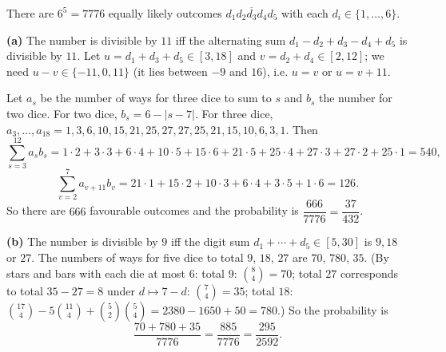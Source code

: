 There are \(6^5=7776\) equally likely outcomes \(\overline{d_1d_2d_3d_4d_5}\) with each \(d_i\in\{1,\dots,6\}\).

\textbf{(a)} The number is divisible by \(11\) iff the alternating sum \(d_1-d_2+d_3-d_4+d_5\) is divisible by \(11\). Let \(u=d_1+d_3+d_5\in[3,18]\) and \(v=d_2+d_4\in[2,12]\); we need \(u-v\in\{-11,0,11\}\) (it lies between \(-9\) and \(16\)), i.e. \(u=v\) or \(u=v+11\).

Let \(a_s\) be the number of ways for three dice to sum to \(s\) and \(b_s\) the number for two dice. For two dice, \(b_s=6-|s-7|\). For three dice, \(a_3,\dots,a_{18}=1,3,6,10,15,21,25,27,27,25,21,15,10,6,3,1\). Then
\[
\sum_{s=3}^{12}a_sb_s=1\cdot2+3\cdot3+6\cdot4+10\cdot5+15\cdot6+21\cdot5+25\cdot4+27\cdot3+27\cdot2+25\cdot1=540,
\]
\[
\sum_{v=2}^{7}a_{v+11}b_v=21\cdot1+15\cdot2+10\cdot3+6\cdot4+3\cdot5+1\cdot6=126 .
\]
So there are \(666\) favourable outcomes and the probability is \(\dfrac{666}{7776}=\boxed{\dfrac{37}{432}}\).

\textbf{(b)} The number is divisible by \(9\) iff the digit sum \(d_1+\cdots+d_5\in[5,30]\) is \(9,18\) or \(27\). The numbers of ways for five dice to total \(9\), \(18\), \(27\) are \(70\), \(780\), \(35\). (By stars and bars with each die at most \(6\): total \(9\): \(\binom{8}{4}=70\); total \(27\) corresponds to total \(35-27=8\) under \(d\mapsto7-d\): \(\binom74=35\); total \(18\): \(\binom{17}{4}-5\binom{11}{4}+\binom{5}{2}\binom{5}{4}=2380-1650+50=780\).) So the probability is
\[
\dfrac{70+780+35}{7776}=\dfrac{885}{7776}=\boxed{\dfrac{295}{2592}}.
\]
